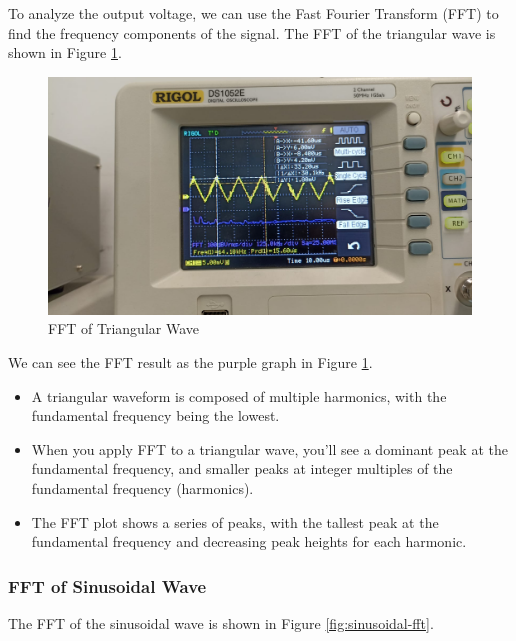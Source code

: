 To analyze the output voltage, we can use the Fast Fourier Transform (FFT) to find the frequency components of the signal. The FFT of the triangular wave is shown in Figure \ref{fig:triangular-fft}.

\begin{figure}[h]
    \centering
    \includegraphics[width=1\textwidth]{assets/triangular-fft.jpg}
    \caption{FFT of Triangular Wave}
    \label{fig:triangular-fft}
\end{figure}

We can see the FFT result as the purple graph in Figure \ref{fig:triangular-fft}.

\begin{itemize}
    \item A triangular waveform is composed of multiple harmonics, with the fundamental frequency being the lowest.
    \item When you apply FFT to a triangular wave, you'll see a dominant peak at the fundamental frequency, and smaller peaks at integer multiples of the fundamental frequency (harmonics).
    \item The FFT plot shows a series of peaks, with the tallest peak at the fundamental frequency and decreasing peak heights for each harmonic. 
\end{itemize}

\newpage
\thispagestyle{plain}

\subsubsection{FFT of Sinusoidal Wave}

The FFT of the sinusoidal wave is shown in Figure \ref{fig:sinusoidal-fft}.

